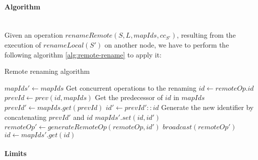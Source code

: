 \documentclass[a4paper]{article}
\begin{document}
\paragraph{Algorithm}~\\

Given an operation $renameRemote(S, L, mapIds, cc_{S'})$,
resulting from the execution of $renameLocal(S')$ on another node,
we have to perform the following algorithm \ref{alg:remote-rename} to apply it:

\begin{algorithm}
  \caption{Remote renaming algorithm}
  \label{alg:remote-rename}
  \begin{algorithmic}
      \State $mapIds' \gets mapIds$
      \Comment Get concurrent operations to the renaming
        \State $id \gets remoteOp.id$
          \State $prevId \gets prev(id, mapIds)$
          \Comment Get the predecessor of $id$ in $mapIds$
          \State $prevId' \gets mapIds.get(prevId)$
          \State $id' \gets prevId' :: id$
          \Comment Generate the new identifier by concatenating $prevId'$ and $id$
          \State $mapIds'.set(id, id')$
          \State $remoteOp' \gets generateRemoteOp(remoteOp, id')$
          \State $broadcast(remoteOp')$
        \EndIf
      \EndFor
        \State $id \gets mapIds'.get(id)$
      \EndFor
    \EndProcedure
  \end{algorithmic}
\end{algorithm}

\paragraph{Limits}~\\
\end{document}
